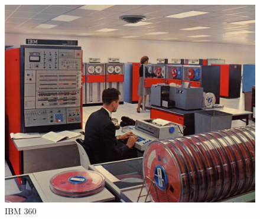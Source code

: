 \documentclass[t,aspectratio=169]{beamer}
\begin{document}
\begin{frame}
\begin{figure}
\begin{centering}
{                \includegraphics[height=0.7\textheight]{ibm-360}
                \caption{IBM 360}
            }
        \end{centering}
    \end{figure}

\end{frame}
\end{document}
